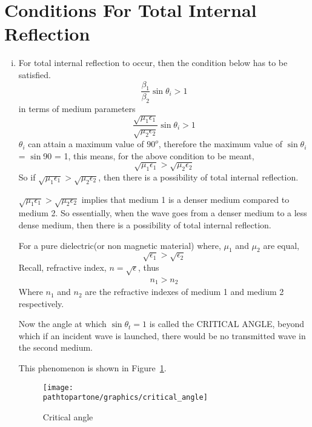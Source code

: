 \section{Conditions For Total Internal Reflection}
\begin{enumerate}[(i)]
\item For total internal reflection to occur, then the condition below has to be satisfied.
\begin{equation*}
\frac{\beta_1}{\beta_2}\sin\theta_i > 1
\end{equation*}
in terms of medium parameters
\begin{equation*}
\frac{\sqrt{\mu_1\epsilon_1}}{\sqrt{\mu_2\epsilon_2}}\sin\theta_i > 1
\end{equation*}
$\theta_i$ can attain a maximum value of $90^{o}$, therefore the maximum value of $\sin\theta_i$ = $\sin$90 = 1, this means, for the above condition to be meant,
\begin{equation}
\sqrt{\mu_1\epsilon_1} > \sqrt{\mu_2\epsilon_2}
\end{equation}
So if $\sqrt{\mu_1\epsilon_1} > \sqrt{\mu_2\epsilon_2}$, then there is a possibility of total internal reflection.

$\sqrt{\mu_1\epsilon_1} > \sqrt{\mu_2\epsilon_2}$ implies that medium 1 is a denser medium compared to medium 2. So essentially, when the wave goes from a denser medium to a less dense medium, then there is a possibility of total internal reflection.

For a pure dielectric(or non magnetic material) where, $\mu_1$ and $\mu_2$ are equal,
\begin{equation*}
\sqrt{\epsilon_1} > \sqrt{\epsilon_2}
\end{equation*}
Recall, refractive index, $n = \sqrt{\epsilon}$, thus
\begin{align*}
n_1 > n_2
\end{align*}
Where $n_1$ and $n_2$ are the refractive indexes of medium 1 and medium 2 respectively.

Now the angle at which $\sin\theta_t = 1$ is called the CRITICAL ANGLE, beyond which if an incident wave is launched, there would be no transmitted wave in the second medium.

This phenomenon is shown in Figure~\ref {critical_angle}.
\begin{figure}[h]
\centering
\texttt{[image: \\pathtopartone/graphics/critical\_angle]}
\caption{Critical angle}
\label{critical_angle}
\end{figure}


\end{enumerate}
